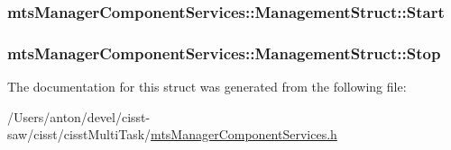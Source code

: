 \subsubsection[{Start}]{ mts\+Manager\+Component\+Services\+::\+Management\+Struct\+::\+Start}\label{structmts_manager_component_services_1_1_management_struct_a12bb1e5a539b17a03dcf9ec0f631787d}
\hypertarget{structmts_manager_component_services_1_1_management_struct_a7a57c05959bfe8bb619c8a6f0b68e537}{}
\subsubsection[{Stop}]{ mts\+Manager\+Component\+Services\+::\+Management\+Struct\+::\+Stop}\label{structmts_manager_component_services_1_1_management_struct_a7a57c05959bfe8bb619c8a6f0b68e537}


The documentation for this struct was generated from the following file\+:\begin{DoxyCompactItemize}
\item 
/\+Users/anton/devel/cisst-\/saw/cisst/cisst\+Multi\+Task/\hyperlink{mts_manager_component_services_8h}{mts\+Manager\+Component\+Services.\+h}\end{DoxyCompactItemize}
